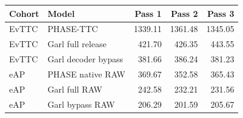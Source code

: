 \begin{tabular}{llrrr}
\toprule
Cohort & Model & Pass 1 & Pass 2 & Pass 3 \\
\midrule
EvTTC & PHASE-TTC & 1339.11 & 1361.48 & 1345.05 \\
EvTTC & Garl full release & 421.70 & 426.35 & 443.55 \\
EvTTC & Garl decoder bypass & 381.66 & 386.24 & 381.23 \\
eAP & PHASE native RAW & 369.67 & 352.58 & 365.43 \\
eAP & Garl full RAW & 242.58 & 232.21 & 231.56 \\
eAP & Garl bypass RAW & 206.29 & 201.59 & 205.67 \\
\bottomrule
\end{tabular}
